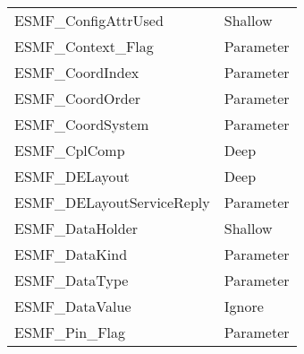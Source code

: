 \begin{table}[t]
\begin{tabular}{ll}
ESMF\_ConfigAttrUsed        & Shallow\\
ESMF\_Context\_Flag           & Parameter \\
ESMF\_CoordIndex            & Parameter \\
ESMF\_CoordOrder            & Parameter \\
ESMF\_CoordSystem           & Parameter \\
ESMF\_CplComp               & Deep \\
ESMF\_DELayout              & Deep \\
ESMF\_DELayoutServiceReply  & Parameter \\
ESMF\_DataHolder            & Shallow\\
ESMF\_DataKind              & Parameter \\
ESMF\_DataType              & Parameter \\
ESMF\_DataValue             & Ignore\\
ESMF\_Pin\_Flag             & Parameter \\

\end{tabular}
\end{table}



